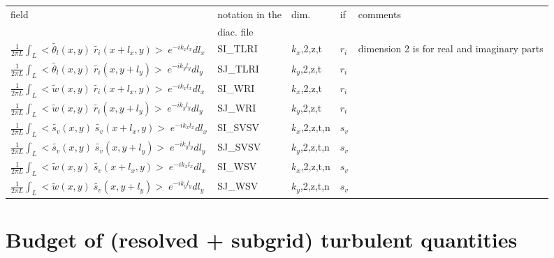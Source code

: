 \begin{center}
\begin{makeimage}
\begin{tabular}{||p{6cm}|>{\centering}p{2.5cm}|>{\centering}p{1.5cm}|>{\centering}p{0.5cm}|p{5cm }||}
\hline
\hline
field & notation in the & dim. &  if  & comments\\
& diac. file &           &  & \\
\hline
\hline
$\frac{1}{2\pi L}\int_L<\tilde{\theta_l}(x,y)\;\tilde{r_i}(x+l_x,y)>\;e^{-ik_xl_x}dl_x$ & SI\_TLRI & $k_x$,2,z,t & $r_i$ &\multirow{16}{5cm}{ dimension 2 is for real and imaginary parts} \\
\cline{1-4}
$\frac{1}{2\pi L}\int_L<\tilde{\theta_l}(x,y)\;\tilde{r_i}(x,y+l_y)>\;e^{-ik_yl_y}dl_y$ & SJ\_TLRI & $k_y$,2,z,t & $r_i$ & \\
\cline{1-4}
$\frac{1}{2\pi L}\int_L<\tilde{w}(x,y)\;\tilde{r_i}(x+l_x,y)>\;e^{-ik_xl_x}dl_x$ & SI\_WRI & $k_x$,2,z,t & $r_i$ & \\
\cline{1-4}
$\frac{1}{2\pi L}\int_L<\tilde{w}(x,y)\;\tilde{r_i}(x,y+l_y)>\;e^{-ik_yl_y}dl_y$ & SJ\_WRI & $k_y$,2,z,t & $r_i$ & \\
\cline{1-4}
$\frac{1}{2\pi L}\int_L<\tilde{s_v}(x,y)\;\tilde{s_v}(x+l_x,y)>\;e^{-ik_xl_x}dl_x$ & SI\_SVSV & $k_x$,2,z,t,n & $s_v$ & \\
\cline{1-4}
$\frac{1}{2\pi L}\int_L<\tilde{s_v}(x,y)\;\tilde{s_v}(x,y+l_y)>\;e^{-ik_yl_y}dl_y$ & SJ\_SVSV & $k_y$,2,z,t,n & $s_v$ & \\
\cline{1-4}
$\frac{1}{2\pi L}\int_L<\tilde{w}(x,y)\;\tilde{s_v}(x+l_x,y)>\;e^{-ik_xl_x}dl_x$ & SI\_WSV & $k_x$,2,z,t,n & $s_v$ & \\
\cline{1-4}
$\frac{1}{2\pi L}\int_L<\tilde{w}(x,y)\;\tilde{s_v}(x,y+l_y)>\;e^{-ik_yl_y}dl_y$ & SJ\_WSV & $k_y$,2,z,t,n & $s_v$ & \\
\hline
\hline
\end{tabular}
\end{makeimage}
\end{center}
\newpage
\section{Budget of (resolved + subgrid) turbulent quantities}

